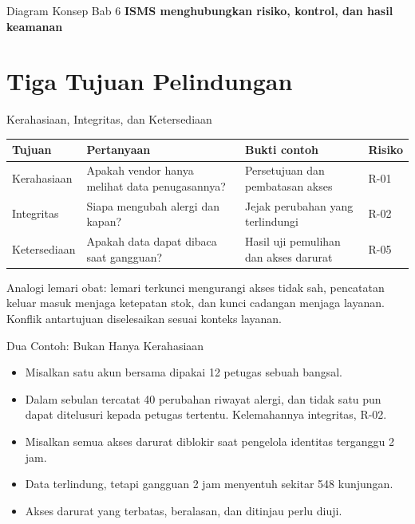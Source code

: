 \documentclass[aspectratio=169, table, 12pt]{beamer}
\begin{document}
\begin{frame}{{\Large Diagram Konsep Bab 6}}
  \centering
  {\small\bfseries ISMS menghubungkan risiko, kontrol, dan hasil keamanan}\par\medskip
  \label{fig:session06-ilustrasi-bab}
\end{frame}

\section{Tiga Tujuan Pelindungan}

\begin{frame}{{\Large Kerahasiaan, Integritas, dan Ketersediaan}}
  \vspace{4pt}
  \footnotesize
  \begin{tabularx}{\textwidth}{|>{\raggedright\arraybackslash}p{}|>{\raggedright\arraybackslash}X|>{\raggedright\arraybackslash}X|>{\raggedright\arraybackslash}p{}|}
    \hline
    \textbf{Tujuan} & \textbf{Pertanyaan} & \textbf{Bukti contoh} & \textbf{Risiko} \\ \hline
    Kerahasiaan & Apakah vendor hanya melihat data penugasannya? & Persetujuan dan pembatasan
    akses & R-01 \\ \hline
    Integritas & Siapa mengubah alergi dan kapan? & Jejak perubahan yang terlindungi & R-02 \\
    \hline
    Ketersediaan & Apakah data dapat dibaca saat gangguan? & Hasil uji pemulihan dan akses darurat
    & R-05 \\ \hline
  \end{tabularx}

  \vspace{8pt}
  \small Analogi lemari obat: lemari terkunci mengurangi akses tidak sah, pencatatan keluar masuk
  menjaga ketepatan stok, dan kunci cadangan menjaga layanan. Konflik antartujuan diselesaikan
  sesuai konteks layanan.
\end{frame}

\begin{frame}{{\Large Dua Contoh: Bukan Hanya Kerahasiaan}}
  \vspace{6pt}
  \small
  \begin{itemize}
    \item Misalkan satu akun bersama dipakai 12 petugas sebuah bangsal.
    \item Dalam sebulan tercatat 40 perubahan riwayat alergi, dan tidak satu pun dapat ditelusuri
          kepada petugas tertentu. Kelemahannya integritas, R-02.
    \item Misalkan semua akses darurat diblokir saat pengelola identitas terganggu 2 jam.
    \item Data terlindung, tetapi gangguan 2 jam menyentuh sekitar 548 kunjungan.
    \item Akses darurat yang terbatas, beralasan, dan ditinjau perlu diuji.
  \end{itemize}
\end{frame}
\end{document}
